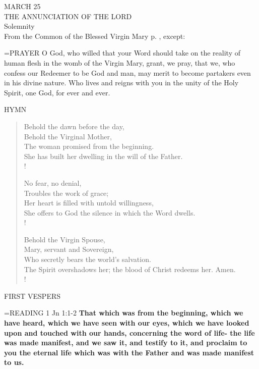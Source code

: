 \begin{center}\normalsize MARCH 25\\
\footnotesize THE ANNUNCIATION OF THE LORD\\
\footnotesize Solemnity\\
\footnotesize From the Common of the Blessed Virgin Mary p.   , except:\\
\end{center}

\hangindent=\parindent \small{PRAYER 
O God, who willed that your Word
should take on the reality of human flesh
in the womb of the Virgin Mary,
grant, we pray,
that we, who confess our Redeemer to be God and man,
may merit to become partakers even in his divine nature.
Who lives and reigns with you in the unity of the Holy Spirit,
one God, for ever and ever.\\}
 

\noindent\small{\uppercase{Hymn}}\normalsize\label{annunciation:hymn}
\begin{verse}
Behold the dawn before the day,\\
Behold the Virginal Mother,\\
The woman promised from the beginning.\\
She has built her dwelling in the will of the Father.\\!

No fear, no denial,\\
Troubles the work of grace;\\
Her heart is filled with untold willingness,\\
She offers to God the silence in which the Word dwells.\\!

Behold the Virgin Spouse,\\
Mary, servant and Sovereign,\\
Who secretly bears the world’s salvation.\\
The Spirit overshadows her; the blood of Christ redeems her. Amen.\\!
\end{verse}

\begin{flushleft}\normalsize FIRST VESPERS\\\end{flushleft}

\hangindent=\parindent \small{READING} 1 Jn 1:1-2 \textbf{That which was from the beginning, which we
have heard, which we have seen with our eyes, which we have
looked upon and touched with our hands, concerning the word of
life- the life was made manifest, and we saw it, and testify to it, and
proclaim to you the eternal life which was with the Father and was
made manifest to us.\\}
 
